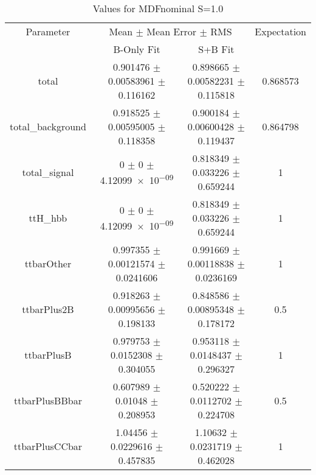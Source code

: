 \begin{table}
\centering
\caption{Values for MDFnominal S=1.0}
\begin{tabular}{cccc}
\toprule
Parameter & \multicolumn{2}{c}{Mean $\pm$ Mean Error $\pm$ RMS} & Expectation\\
 & B-Only Fit & S+B Fit & \\
\midrule
total & \num{0.901476} $\pm$ \num{0.00583961} $\pm$ \num{0.116162} & \num{0.898665} $\pm$ \num{0.00582231} $\pm$ \num{0.115818} & \num{0.868573}\\
total\_background & \num{0.918525} $\pm$ \num{0.00595005} $\pm$ \num{0.118358} & \num{0.900184} $\pm$ \num{0.00600428} $\pm$ \num{0.119437} & \num{0.864798}\\
total\_signal & \num{0} $\pm$ \num{0} $\pm$ \num{4.12099e-09} & \num{0.818349} $\pm$ \num{0.033226} $\pm$ \num{0.659244} & \num{1}\\
ttH\_hbb & \num{0} $\pm$ \num{0} $\pm$ \num{4.12099e-09} & \num{0.818349} $\pm$ \num{0.033226} $\pm$ \num{0.659244} & \num{1}\\
ttbarOther & \num{0.997355} $\pm$ \num{0.00121574} $\pm$ \num{0.0241606} & \num{0.991669} $\pm$ \num{0.00118838} $\pm$ \num{0.0236169} & \num{1}\\
ttbarPlus2B & \num{0.918263} $\pm$ \num{0.00995656} $\pm$ \num{0.198133} & \num{0.848586} $\pm$ \num{0.00895348} $\pm$ \num{0.178172} & \num{0.5}\\
ttbarPlusB & \num{0.979753} $\pm$ \num{0.0152308} $\pm$ \num{0.304055} & \num{0.953118} $\pm$ \num{0.0148437} $\pm$ \num{0.296327} & \num{1}\\
ttbarPlusBBbar & \num{0.607989} $\pm$ \num{0.01048} $\pm$ \num{0.208953} & \num{0.520222} $\pm$ \num{0.0112702} $\pm$ \num{0.224708} & \num{0.5}\\
ttbarPlusCCbar & \num{1.04456} $\pm$ \num{0.0229616} $\pm$ \num{0.457835} & \num{1.10632} $\pm$ \num{0.0231719} $\pm$ \num{0.462028} & \num{1}\\
\bottomrule
\end{tabular}
\end{table}